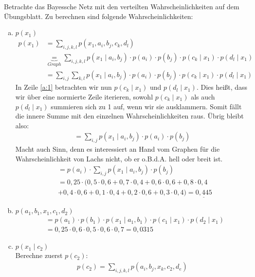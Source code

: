 \begin{aufgabe}
\end{aufgabe}
Betrachte das Bayessche Netz mit den verteilten Wahrscheinlichkeiten auf dem Übungsblatt. Zu berechnen sind folgende Wahrscheinlichkeiten:
\begin{enumerate}[a)]
	\item $p(x_1)$
	\begin{align}
		p(x_1) &= \sum_{i,j,k,l} p(x_1,a_i,b_j,c_k,d_l)\\
		&\underbrace{=}_{Graph} \sum_{i,j,k,l} p(x_1\mid a_i,b_j)\cdot p(a_i)\cdot p(b_j) \cdot p(c_k\mid x_1) \cdot p(d_l\mid x_1)\\
	    &= \sum_{i,j} \sum_{k,l} p(x_1\mid a_i,b_j)\cdot p(a_i)\cdot p(b_j) \cdot p(c_k\mid x_1) \cdot p(d_l\mid x_1)\label{a:1}
	\end{align}
	In Zeile \ref{a:1} betrachten wir nun $p(c_k\mid x_1)$ und $p(d_l\mid x_1)$. Dies heißt, dass wir über eine normierte Zeile iterieren, sowohl $p(c_k\mid x_1)$ als auch $p(d_l\mid x_1)$ summieren sich zu 1 auf, wenn wir sie ausklammern. Somit fällt die innere Summe mit den einzelnen Wahrscheinlichkeiten raus. Übrig bleibt also:
	\begin{align}
	= \sum_{i,j} p(x_1\mid a_i,b_j)\cdot p(a_i)\cdot p(b_j)
	\end{align}
	Macht auch Sinn, denn es interessiert an Hand vom Graphen für die Wahrscheinlichkeit von Lachs nicht, ob er o.B.d.A. hell oder breit ist.
	\begin{align}
	&= p(a_i) \cdot \sum_{i,j} p(x_1\mid a_i,b_j) \cdot p(b_j)\\
	&= 0,25 \cdot (0,5 \cdot 0,6 + 0,7\cdot 0,4 + 0,6\cdot 0,6 + 0,8\cdot 0,4 \\
	&+ 0,4\cdot 0,6 + 0,1\cdot 0,4 + 0,2\cdot 0,6 + 0,3\cdot 0,4) = \underline{0,445}
	\end{align}
	\item $p(a_1,b_1,x_1,c_1,d_2)$
	\begin{align*}
	&= p(a_1) \cdot p(b_1) \cdot p(x_1\mid a_1,b_1) \cdot p(c_1\mid x_1) \cdot p(d_2\mid x_1)\\
	&= 0,25 \cdot 0,6 \cdot 0,5 \cdot 0,6 \cdot 0,7 = 0,0315
	\end{align*}
	\item $p(x_1\mid c_2)$\\
	Berechne zuerst $p(c_2)$:
	\begin{align*}
		p(c_2) = \sum_{i,j,k,l} p(a_i,b_j,x_k,c_2,d_e)\\
	\end{align*}

\end{enumerate}
